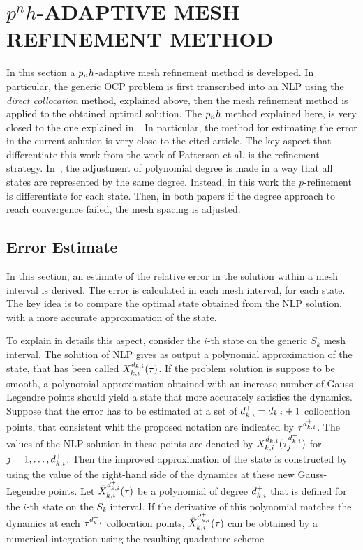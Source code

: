 \section*{$p^n h$-ADAPTIVE MESH REFINEMENT METHOD}

In this section a $p_{n}h$-adaptive mesh refinement method is developed. In particular, the generic OCP problem is first transcribed into an NLP using the \emph{direct collocation} method, explained above, then the mesh refinement method is applied to the obtained optimal solution.
The $p_{n}h$ method explained here, is very closed to the one explained in~\cite{Patterson:OCAM:2015}. In particular, the method for estimating the error in the current solution is very close to the cited article. The key aspect that differentiate this work from the  work of Patterson et al. is the refinement strategy.
In~\cite{Patterson:OCAM:2015}, the adjustment of polynomial degree is made in a way that all states are represented by the same degree. Instead, in this work the $p$-refinement is differentiate for each state. Then, in both papers if the degree approach to reach convergence failed, the mesh spacing is adjusted.


\subsection*{Error Estimate}

In this section, an estimate of the relative error in the solution within a mesh interval is derived. The error is calculated in each mesh interval, for each state.
The key idea is to compare the optimal state obtained from the NLP solution, with a more accurate approximation of the state.

To explain in details this aspect, consider the $i$-th state on the generic $S_k$ mesh interval.
The solution of NLP gives as output a polynomial approximation of the state, that has been called $X_{k,i}^{d_{k,i}} (\tau)$.
If the problem solution is suppose to be smooth, a polynomial approximation obtained with an increase number of Gauss-Legendre points should yield a state that more accurately satisfies the dynamics.
Suppose that the error has to be estimated at a set of  $d_{k,i}^{+} = d_{k,i} + 1$ collocation points, that consistent whit the proposed notation are indicated by $\tau^{{d}_{k,i}^{+}}$.
The values of the NLP solution in these points are denoted by $X_{k,i}^{d_{k,i}} (\tau^{{d}_{k,i}^{+}}_j)$ for $j = 1, \dots, d_{k,i}^{+}$.
Then the improved approximation of the state is constructed by using the value of the right-hand side of the dynamics at these new Gauss-Legendre points.
Let $\bar{X}_{k,i}^{d_{k,i}^{+}} (\tau)$ be a polynomial of degree $d_{k,i}^{+}$ that is defined for the $i$-th state on the $S_k$ interval. If the derivative of this polynomial matches the dynamics at each $\tau^{{d}_{k,i}^{+}}$ collocation points, $\bar{X}_{k,i}^{d_{k,i}^{+}} (\tau)$ can be obtained by a numerical integration using the resulting quadrature scheme

